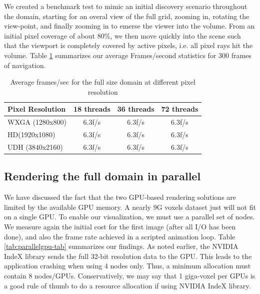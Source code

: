 \documentclass[final,5p,times,twocolumn]{elsarticle}
\begin{document}
We created a benchmark test to mimic an initial discovery scenario throughout
the domain, starting for an overal view of the full grid, zooming in, rotating
the view-point, and finally zooming in to emerse the viewer into the volume. From
an initial pixel coverage of about 80\%, we then move quickly into the scene such that
the viewport is completely covered by active pixels, i.e. all pixel rays hit the volume.
Table \ref{tab:osprayThreads} summarizes
our average Frames/second statistics for 300 frames of navigation.

\begin{table}[htb]
  \centering
  \caption{
    Average frames/sec for the full size domain at different pixel resolution
  }
  \label{tab:osprayThreads}

  \begin{tabular}{lccc}
    \hline
    Pixel Resolution & 18 threads & 36 threads & 72 threads\\
    \hline
    WXGA (1280x800) & 6.3f/s &  6.3f/s & 6.3f/s \\
    HD(1920x1080) & 6.3f/s &  6.3f/s & 6.3f/s \\
    UDH (3840x2160) & 6.3f/s &  6.3f/s & 6.3f/s\\
    \hline

  \end{tabular}
\end{table}

\subsection{Rendering the full domain in parallel}

We have discussed the fact that the two GPU-based rendering solutions
are limited by the available GPU memory. A nearly 9G voxels dataset just will
not fit on a single GPU. To enable our visualization, we must use a parallel 
set of nodes. We measure again the initial cost for the first image
(after all I/O has been done), and also the frame rate achieved in a scripted
animation loop. Table \ref{tab:parallelgpu-tab} summarizes our findings. As noted earlier,
the NVIDIA IndeX library sends the full 32-bit resolution data to the GPU. This
leads to the application crashing when using 4 nodes only. Thus, a minimum
allocation must contain 8 nodes/GPUs. Conservatively, we may say that 1 giga-voxel
per GPUs is a good rule of thumb to do a resource allocation if using NVIDIA IndeX library.
\end{document}

